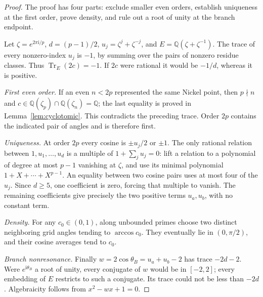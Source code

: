 \documentclass[11pt]{article}
\numberwithin{equation}{section}
\theoremstyle{definition}
\newcommand{\ii}{\mathrm i}
\newcommand{\Q}{\mathbb Q}
\begin{document}
\begin{proof}
The proof has four parts: exclude smaller even orders, establish uniqueness at the first order, prove density, and rule out a root of unity at the branch endpoint.

Let \(\zeta=e^{2\pi\ii/p}\), \(d=(p-1)/2\),
\(u_j=\zeta^j+\zeta^{-j}\), and \(E=\Q(\zeta+\zeta^{-1})\).
The trace of every nonzero-index \(u_j\) is \(-1\), by summing over the
pairs of nonzero residue classes. Thus
\(\operatorname{Tr}_E(2c)=-1\). If \(2c\) were rational it would be
\(-1/d\), whereas it is positive.

\smallskip\noindent\textit{First even order.}
If an even \(n<2p\) represented the same Nickel point, then \(p\nmid n\)
and \(c\in\Q(\zeta_p)\cap\Q(\zeta_n)=\Q\);
the last equality is proved in Lemma~\ref{lem:cyclotomic}.
This contradicts the preceding trace. Order \(2p\) contains the indicated
pair of angles and is therefore first.

\smallskip\noindent\textit{Uniqueness.}
At order \(2p\) every cosine is \(\pm u_j/2\) or \(\pm1\).
The only rational relation between \(1,u_1,\ldots,u_d\) is a multiple of
\(1+\sum_j u_j=0\): lift a relation to a polynomial of degree at most
\(p-1\) vanishing at \(\zeta\), and use its minimal polynomial
\(1+X+\cdots+X^{p-1}\). An equality between two cosine pairs uses at most
four of the \(u_j\). Since \(d\ge5\), one coefficient is zero, forcing
that multiple to vanish. The remaining coefficients give precisely the
two positive terms \(u_a,u_b\), with no constant term.

\smallskip\noindent\textit{Density.}
For any \(c_0\in(0,1)\), along unbounded primes choose two distinct
neighboring grid angles tending to \(\arccos c_0\). They eventually lie
in \((0,\pi/2)\), and their cosine averages tend to \(c_0\).

\smallskip\noindent\textit{Branch nonresonance.}
Finally \(w=2\cos\theta_B=u_a+u_b-2\) has trace \(-2d-2\).
Were \(e^{\ii\theta_B}\) a root of unity, every conjugate of \(w\)
would be in \([-2,2]\); every embedding of \(E\) restricts to such a
conjugate. Its trace could not be less than \(-2d\).
Algebraicity follows from \(x^2-wx+1=0\).
\end{proof}
\end{document}
